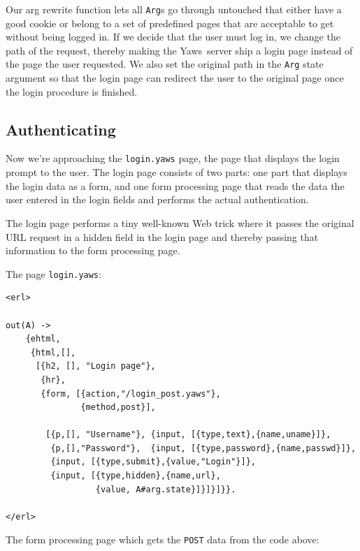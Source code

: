 \documentclass[11pt,oneside,english]{book}
\newcommand{\Yaws}            %
        {{\sc Yaws}}
\begin{document}
Our arg rewrite function lets all \verb+Arg+s go through untouched
that either have a good cookie or belong to a set of predefined pages
that are acceptable to get without being logged in.  If we decide that
the user must log in, we change the path of the request, thereby
making the \Yaws\ server ship a login page instead of the page the
user requested. We also set the original path in the \verb+Arg+ state
argument so that the login page can redirect the user to the original
page once the login procedure is finished.

\subsection{Authenticating}

Now we're approaching the \verb+login.yaws+ page, the page that
displays the login prompt to the user. The login page consists of two
parts: one part that displays the login data as a form, and one form
processing page that reads the data the user entered in the login
fields and performs the actual authentication.

The login page performs a tiny well-known Web trick where it passes
the original URL request in a hidden field in the login page and
thereby passing that information to the form processing page.

The page \verb+login.yaws+:

\begin{verbatim}
<erl>

out(A) ->
    {ehtml,
     {html,[],
      [{h2, [], "Login page"},
       {hr},
       {form, [{action,"/login_post.yaws"},
               {method,post}],

        [{p,[], "Username"}, {input, [{type,text},{name,uname}]},
         {p,[],"Password"},  {input, [{type,password},{name,passwd}]},
         {input, [{type,submit},{value,"Login"}]},
         {input, [{type,hidden},{name,url},
                  {value, A#arg.state}]}]}]}}.

</erl>
\end{verbatim}



The form processing page which gets the \verb+POST+ data from the code
above:
\end{document}

